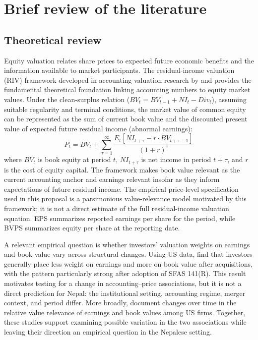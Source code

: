 \section{Brief review of the literature}

\subsection{Theoretical review}

Equity valuation relates share prices to expected future economic benefits and the information available to market participants. The residual-income valuation (RIV) framework developed in accounting valuation research by \citet{ohlson1995} and \citet{feltham1995} provides the fundamental theoretical foundation linking accounting numbers to equity market values. Under the clean-surplus relation ($BV_{t} = BV_{t-1} + NI_{t} - Div_{t}$), assuming suitable regularity and terminal conditions, the market value of common equity can be represented as the sum of current book value and the discounted present value of expected future residual income (abnormal earnings):
\begin{equation}
P_{t} = BV_{t} + \sum_{\tau=1}^{\infty} \frac{E_{t}[\mathit{NI}_{t+\tau} - r \cdot BV_{t+\tau-1}]}{(1+r)^{\tau}}
\label{eq:ohlson}
\end{equation}
where $BV_t$ is book equity at period $t$, $NI_{t+\tau}$ is net income in period $t+\tau$, and $r$ is the cost of equity capital. The framework makes book value relevant as the current accounting anchor and earnings relevant insofar as they inform expectations of future residual income. The empirical price-level specification used in this proposal is a parsimonious value-relevance model motivated by this framework; it is not a direct estimate of the full residual-income valuation equation. EPS summarizes reported earnings per share for the period, while BVPS summarizes equity per share at the reporting date.

A relevant empirical question is whether investors' valuation weights on earnings and book value vary across structural changes. Using US data, \citet{kwon2020} find that investors generally place less weight on earnings and more on book value after acquisitions, with the pattern particularly strong after adoption of SFAS 141(R). This result motivates testing for a change in accounting--price associations, but it is not a direct prediction for Nepal: the institutional setting, accounting regime, merger context, and period differ. More broadly, \citet{collins1997} document changes over time in the relative value relevance of earnings and book values among US firms. Together, these studies support examining possible variation in the two associations while leaving their direction an empirical question in the Nepalese setting.

